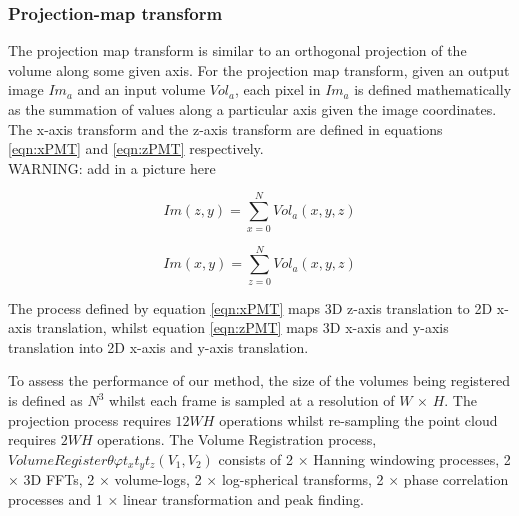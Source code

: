 \subsubsection{Projection-map transform}

The projection map transform is similar to an orthogonal projection of the volume along some given axis. For the projection map transform, given an output image $Im_a$ and an input volume $Vol_a$, each pixel in $Im_a$ is defined mathematically as the summation of values along a particular axis given the image coordinates. The x-axis transform and the z-axis transform are defined in equations \ref{eqn:xPMT} and \ref{eqn:zPMT} respectively. \\

WARNING: add in a picture here

\begin{equation} \label{eqn:xPMT}
Im(z,y) = \sum_{x=0}^{N}{Vol_a(x,y,z)}
\end{equation}

\begin{equation} \label{eqn:zPMT}
Im(x,y) = \sum_{z=0}^{N}{Vol_a(x,y,z)}
\end{equation}

The process defined by equation \ref{eqn:xPMT} maps 3D z-axis translation to 2D x-axis translation, whilst equation \ref{eqn:zPMT} maps 3D x-axis and y-axis translation into 2D x-axis and y-axis translation.


To assess the performance of our method, the size of the volumes being registered is defined as $N^3$ whilst each frame is sampled at a resolution of $W$ $\times$ $H$. The projection process requires $12WH$ operations whilst re-sampling the point cloud requires $2WH$ operations. The Volume Registration process, $VolumeRegister{\theta \varphi t_x t_y t_z}(V_1, V_2)$ consists of 2 $\times$ Hanning windowing processes, 2 $\times$ 3D FFTs, 2 $\times$ volume-logs, 2 $\times$ log-spherical transforms, 2 $\times$ phase correlation processes and 1 $\times$ linear transformation and peak finding. 

